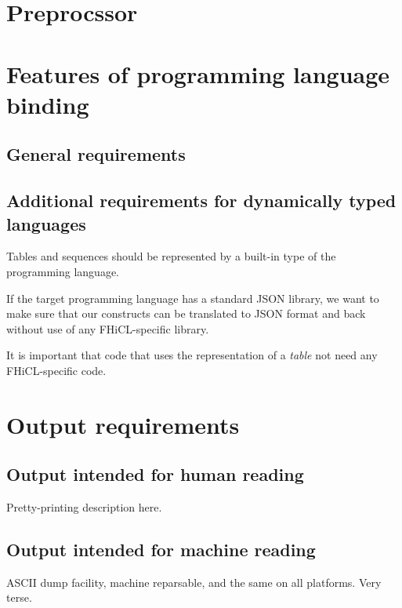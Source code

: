 \documentclass{memarticle}
\begin{document}
\chapter{Preprocssor}

\chapter{Features of programming language binding}

\section{General requirements}


\section{Additional requirements for dynamically typed languages}

Tables and sequences should be represented by a built-in type of the
programming language.

If the target programming language has a standard JSON library, we
want to make sure that our constructs can be translated to JSON format
and back without use of any FHiCL-specific library.

It is important that code that uses the representation of a
\emph{table} not need any FHiCL-specific code.

\chapter{Output requirements}

\section{Output intended for human reading}
\begin{fixme}
  Pretty-printing description here.
\end{fixme}
\section{Output intended for machine reading}
\begin{fixme}
  ASCII dump facility, machine reparsable, and the same on all
  platforms. Very terse.
\end{fixme}


\printindex
\end{document}
